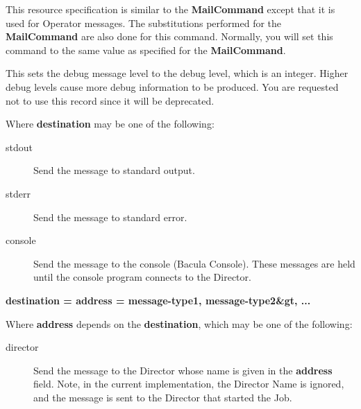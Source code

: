 \begin{description}
\item [OperatorCommand = \lt{}command\gt{}]
   This resource specification is  similar to the {\bf MailCommand} except that
it is used for Operator  messages. The substitutions performed for the {\bf
MailCommand} are  also done for this command. Normally, you will set this
command to the  same value as specified for the {\bf MailCommand}. 

\item [Debug = \lt{}debug-level\gt{}]
   This sets the debug message level  to the debug level, which is an integer.
Higher debug levels cause more  debug information to be produced. You are
requested not to use this  record since it will be deprecated. 

\item [\lt{}destination\gt{} = \lt{}message-type1\gt{},
   \lt{}message-type2\&gt, ...]

Where {\bf destination} may be one of the following:  

\begin{description}

\item [stdout]
   Send the message to standard output.  

\item [stderr]
   Send the message to standard error.  

\item [console]
   Send the message to the console (Bacula Console).  These messages are held
until the console program  connects to the Director.  
\end{description}

\item {\bf \lt{}destination\gt{} = \lt{}address\gt{} =
   \lt{}message-type1\gt{}, \lt{}message-type2\&gt, ...}

Where {\bf address} depends on the {\bf destination}, which  may be one of the
following:  

\begin{description}

\item [director]
   Send the message to the Director whose name  is given in the {\bf address}
field. Note, in the current  implementation, the Director Name is ignored, and
the message  is sent to the Director that started the Job.  


\end{description}
\end{description}
